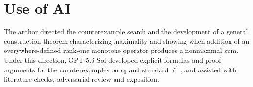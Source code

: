\section*{Use of AI}
The author directed the counterexample search and the development of a
general construction theorem characterizing maximality and showing when
addition of an everywhere-defined rank-one monotone operator produces a
nonmaximal sum. Under this direction, GPT-5.6 Sol developed explicit
formulas and proof arguments for the counterexamples on $c_0$ and standard
$\ell^1$, and assisted with literature checks, adversarial review and
exposition. 

\begingroup
\raggedright


\endgroup


